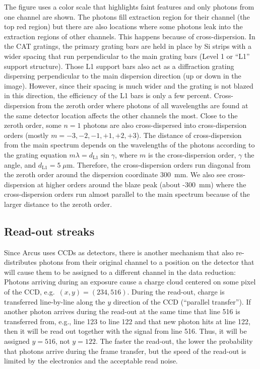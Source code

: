 \documentclass[12pt]{spieman}  %
\begin{document}
\begin{spacing}{2}
The figure uses a color scale that highlights faint features and only photons from one channel are shown. The photons fill extraction region for their channel (the top red region) but there are also locations where some photons leak into the extraction regions of other channels. This happens because of cross-dispersion. In the CAT gratings, the primary grating bars are held in place by Si strips with a wider spacing that run perpendicular to the main grating bars (Level 1 or ``L1'' support structure). Those L1 support bars also act as a diffraction grating dispersing perpendicular to the main dispersion direction (up or down in the image). However, since their spacing is much wider and the grating is not blazed in this direction, the efficiency of the L1 bars is only a few percent.
Cross-dispersion from the zeroth order where photons of all wavelengths are found at the same detector location affects the other channels the most. Close to the zeroth order, some $n=1$ photons are also cross-dispersed into cross-dispersion orders (mostly $m =-3, -2, -1, +1, +2, +3$). The distance of cross-dispersion from the main spectrum depends on the wavelengths of the photons according to the grating equation $m\lambda = d_{\mathrm{L1}}\sin\gamma$, where $m$ is the cross-dispersion order, $\gamma$ the angle, and $d_{\mathrm{L1}}=5\;\mu\mathrm{m}$. Therefore, the cross-dispersion orders run diagonal from the zeroth order around the dispersion coordinate 300~mm. We also see cross-dispersion at higher orders around the blaze peak (about -300~mm) where the cross-dispersion orders run almost parallel to the main spectrum because of the larger distance to the zeroth order.

\subsection{Read-out streaks}
Since Arcus uses CCDs as detectors, there is another mechanism that also re-distributes photons from their original channel to a position on the detector that will cause them to be assigned to a different channel in the data reduction: Photons arriving during an exposure cause a charge cloud centered on some pixel of the CCD, e.g.\ $(x,y) = (234, 516)$. During the read-out, charge is transferred line-by-line along the $y$ direction of the CCD (``parallel transfer''). If another photon arrives during the read-out at the same time that line 516 is transferred from, e.g., line 123 to line 122 and that new photon hits at line 122, then it will be read out together with the signal from line 516. Thus, it will be assigned $y=516$, not $y=122$. The faster the read-out, the lower the probability that photons arrive during the frame transfer, but the speed of the read-out is limited by the electronics and the acceptable read noise.


\end{spacing}
\end{document}
